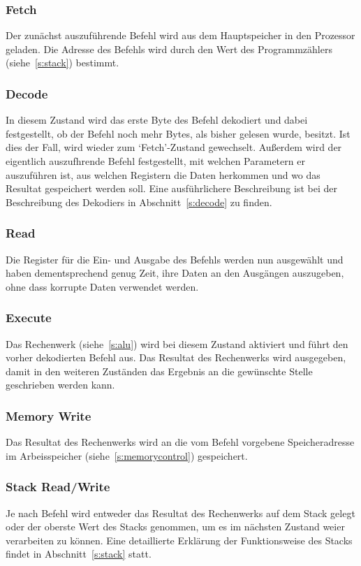 \subsubsection{Fetch}
Der zunächst auszuführende Befehl wird aus dem Hauptspeicher in den Prozessor
geladen. Die Adresse des Befehls wird durch den Wert des Programmzählers
(siehe~\ref{s:stack}) bestimmt.
\subsubsection{Decode}
In diesem Zustand wird das erste Byte des Befehl dekodiert und dabei
festgestellt, ob der Befehl noch mehr Bytes, als bisher gelesen wurde, besitzt.
Ist dies der Fall, wird wieder zum `Fetch'-Zustand gewechselt. Außerdem wird der
eigentlich auszufhrende Befehl festgestellt, mit welchen Parametern er
auszuführen ist, aus welchen Registern die Daten herkommen und wo das Resultat
gespeichert werden soll. Eine ausführlichere Beschreibung ist bei der
Beschreibung des Dekodiers in Abschnitt~\ref{s:decode} zu finden.
\subsubsection{Read}
Die Register für die Ein- und Ausgabe des Befehls werden nun ausgewählt und
haben dementsprechend genug Zeit, ihre Daten an den Ausgängen auszugeben, ohne
dass korrupte Daten verwendet werden.
\subsubsection{Execute}
Das Rechenwerk (siehe~\ref{s:alu}) wird bei diesem Zustand aktiviert und führt
den vorher dekodierten Befehl aus. Das Resultat des Rechenwerks wird ausgegeben,
damit in den weiteren Zuständen das Ergebnis an die gewünschte Stelle
geschrieben werden kann.
\subsubsection{Memory Write}
Das Resultat des Rechenwerks wird an die vom Befehl vorgebene Speicheradresse im
Arbeisspeicher (siehe~\ref{s:memorycontrol}) gespeichert.
\subsubsection{Stack Read/Write}
Je nach Befehl wird entweder das Resultat des Rechenwerks auf dem Stack gelegt
oder der oberste Wert des Stacks genommen, um es im nächsten Zustand weier
verarbeiten zu können. Eine detaillierte Erklärung der Funktionsweise des Stacks
findet in Abschnitt~\ref{s:stack} statt.
